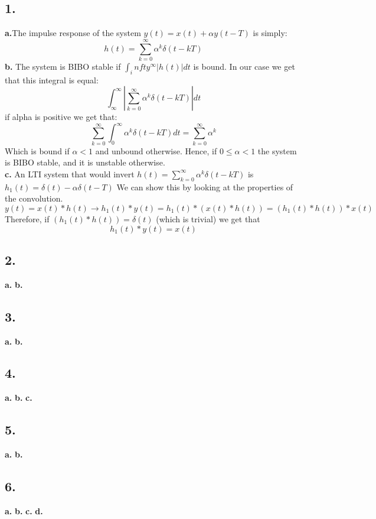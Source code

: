 \documentclass[11pt]{article}
\begin{document}
\subsection*{1.}
\textbf{a.}The impulse response of the system $y(t) = x(t) + \alpha y(t - T)$  is simply:
\[h(t) = \sum_{k = 0}^\infty \alpha^k \delta(t - kT)  \]
\textbf{b.}
The system is BIBO stable if $\int_infty^\infty |h(t)|dt$ is bound. In our case we get that this integral is equal:
\[\int_\infty^\infty |\sum_{k = 0}^\infty \alpha^k \delta(t - kT)| dt\]
if alpha is positive we get that:
\[
\sum_{k = 0}^\infty \int_0^\infty \alpha^k \delta(t - kT)dt  = 
\sum_{k = 0}^\infty \alpha^k
\]
Which is bound if $\alpha < 1$ and unbound otherwise.
Hence, if $0 \leq \alpha < 1$ the system is BIBO stable, and it is unstable otherwise.\\
\textbf{c.}
An LTI system that would invert $h(t) = \sum_{k = 0}^\infty \alpha^k \delta(t - kT)$ is 
$\boxed{h_1(t) = \delta(t) - \alpha \delta(t - T)}$
We can show this by looking at the properties of the convolution.
\[y(t) = x(t) * h(t) \rightarrow h_1(t) * y(t) = h_1(t) * (x(t) * h(t)) = (h_1(t) * h(t)) * x(t)\]
Therefore, if $(h_1(t) * h(t)) = \delta(t)$ (which is trivial) we get that 
\[ h_1(t) * y(t)  = x(t)\]

\subsection*{2.}
\textbf{a.}
\textbf{b.}
\subsection*{3.}
\textbf{a.}
\textbf{b.}
\subsection*{4.}
\textbf{a.}
\textbf{b.}
\textbf{c.}
\subsection*{5.}
\textbf{a.}
\textbf{b.}
\subsection*{6.}
\textbf{a.}
\textbf{b.}
\textbf{c.}
\textbf{d.}
\end{document}
